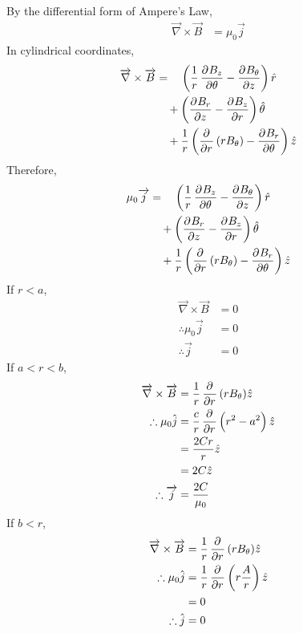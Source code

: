 \documentclass[fleqn, a4paper, 12pt, twoside]{article}
\theoremstyle{definition}
\theoremstyle{theorem}
\begin{document}
\begin{solution}
	By the differential form of Ampere's Law,
	\begin{align*}
		\overrightarrow{\nabla} \times \overrightarrow{B} &= \mu_0 \overrightarrow{j}
	\end{align*}
	In cylindrical coordinates,
	\begin{align*}
		\overrightarrow{\nabla} \times \overrightarrow{B} &= \quad \left( \frac{1}{r} \dpd{B_z}{\theta} - \dpd{B_{\theta}}{z} \right) \hat{r}\\
		&\quad + \left( \dpd{B_r}{z} - \dpd{B_z}{r} \right) \hat{\theta}\\
		&\quad + \frac{1}{r} \left( \dpd{}{r} (r B_{\theta}) - \dpd{B_r}{\theta} \right) \hat{z}\\
	\end{align*}
	Therefore,
	\begin{align*}
		\mu_0 \overrightarrow{j} &= \quad \left( \frac{1}{r} \dpd{B_z}{\theta} - \dpd{B_{\theta}}{z} \right) \hat{r}\\
		&\quad + \left( \dpd{B_r}{z} - \dpd{B_z}{r} \right) \hat{\theta}\\
		&\quad + \frac{1}{r} \left( \dpd{}{r} (r B_{\theta}) - \dpd{B_r}{\theta} \right) \hat{z}\\

	\end{align*}
	If $r < a$,
	\begin{align*}
		\overrightarrow{\nabla} \times \overrightarrow{B} &= 0\\
		\therefore \mu_0 \overrightarrow{j} &= 0\\
		\therefore \overrightarrow{j} &= 0
	\end{align*}
	If $a < r < b$,
	\begin{align*}
		\overrightarrow{\nabla} \times \overrightarrow{B} &= \frac{1}{r} \dpd{}{r} (r B_{\theta}) \hat{z}\\
		\therefore \mu_0 \hat{j} &= \frac{c}{r} \dpd{}{r}\left( r^2 - a^2 \right) \hat{z}\\
		&= \frac{2 C r}{r} \hat{z}\\
		&= 2 C \hat{z}\\
		\therefore \overrightarrow{j} &= \frac{2 C}{\mu_0}
	\end{align*}
	If $b < r$,
	\begin{align*}
		\overrightarrow{\nabla} \times \overrightarrow{B} &= \frac{1}{r} \dpd{}{r} (r B_{\theta}) \hat{z}\\
		\therefore \mu_0 \hat{j} &= \frac{1}{r} \dpd{}{r}\left( r \frac{A}{r} \right) \hat{z}\\
		&= 0\\
		\therefore \hat{j} &= 0
	\end{align*}
\end{solution}
\end{document}
